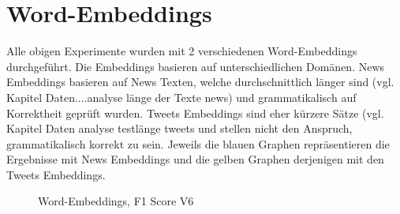 \section{Word-Embeddings}
Alle obigen Experimente wurden mit 2 verschiedenen Word-Embeddings durchgeführt. Die Embeddings basieren auf unterschiedlichen Domänen.
News Embeddings basieren auf News Texten, welche durchschnittlich länger sind (vgl. Kapitel Daten....analyse länge der Texte news) und grammatikalisch auf Korrektheit geprüft wurden.
Tweets Embeddings sind eher kürzere Sätze (vgl. Kapitel Daten analyse testlänge tweets und stellen nicht den Anspruch, grammatikalisch korrekt zu sein.
Jeweils die blauen Graphen repräsentieren die Ergebnisse mit News Embeddings und die gelben Graphen derjenigen mit den Tweets Embeddings.

\begin{figure}[H]
	\centering
	\caption{Word-Embeddings, F1 Score V6}
	\label{fig:Results V6}
\end{figure}

